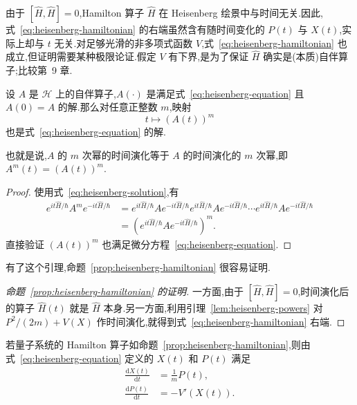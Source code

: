 由于 \([\widehat H,\widehat H]=0\),Hamilton 算子 \(\widehat H\) 在 Heisenberg 绘景中与时间无关.因此,式~\eqref{eq:heisenberg-hamiltonian} 的右端虽然含有随时间变化的 \(P(t)\) 与 \(X(t)\),实际上却与 \(t\) 无关.对足够光滑的非多项式函数 \(V\),式~\eqref{eq:heisenberg-hamiltonian} 也成立,但证明需要某种极限论证.假定 \(V\) 有下界,是为了保证 \(\widehat H\) 确实是(本质)自伴算子;比较第~9 章.

\begin{lemma}[算子幂的时间演化]\label{lem:heisenberg-powers}
设 \(A\) 是 \(\mathcal{H}\) 上的自伴算子,\(A(\cdot)\) 是满足式~\eqref{eq:heisenberg-equation} 且 \(A(0)=A\) 的解.那么对任意正整数 \(m\),映射
\[
t\longmapsto(A(t))^{m}
\]
也是式~\eqref{eq:heisenberg-equation} 的解.
\end{lemma}

也就是说,\(A\) 的 \(m\) 次幂的时间演化等于 \(A\) 的时间演化的 \(m\) 次幂,即 \(A^{m}(t)=(A(t))^{m}\).

\begin{proof}
使用式~\eqref{eq:heisenberg-solution},有
\[
\begin{aligned}
e^{it\widehat H/\hbar}A^{m}e^{-it\widehat H/\hbar}
&=e^{it\widehat H/\hbar}Ae^{-it\widehat H/\hbar}
e^{it\widehat H/\hbar}Ae^{-it\widehat H/\hbar}\cdots
e^{it\widehat H/\hbar}Ae^{-it\widehat H/\hbar}\\
&=\left(e^{it\widehat H/\hbar}Ae^{-it\widehat H/\hbar}\right)^{m}.
\end{aligned}
\]
直接验证 \((A(t))^{m}\) 也满足微分方程~\eqref{eq:heisenberg-equation}.
\end{proof}

有了这个引理,命题~\ref{prop:heisenberg-hamiltonian} 很容易证明.

\begin{proof}[命题~\ref{prop:heisenberg-hamiltonian} 的证明]
一方面,由于 \([\widehat H,\widehat H]=0\),时间演化后的算子 \(\widehat H(t)\) 就是 \(\widehat H\) 本身.另一方面,利用引理~\ref{lem:heisenberg-powers} 对 \(P^{2}/(2m)+V(X)\) 作时间演化,就得到式~\eqref{eq:heisenberg-hamiltonian} 右端.
\end{proof}

\begin{proposition}\label{prop:heisenberg-newton}
若量子系统的 Hamilton 算子如命题~\ref{prop:heisenberg-hamiltonian},则由式~\eqref{eq:heisenberg-equation} 定义的 \(X(t)\) 和 \(P(t)\) 满足
\begin{align}
\frac{\mathrm{d}X(t)}{\mathrm{d}t}&=\frac{1}{m}P(t),\label{eq:heisenberg-position}\\
\frac{\mathrm{d}P(t)}{\mathrm{d}t}&=-V'(X(t)).\label{eq:heisenberg-momentum}
\end{align}
\end{proposition}

